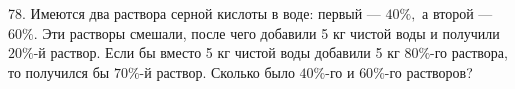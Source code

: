 78. Имеются два раствора серной кислоты в воде: первый --- $40\%,$ а второй --- $60\%.$ Эти растворы смешали, после чего добавили 5 кг чистой воды и получили $20\%$-й раствор. Если бы вместо 5 кг чистой воды добавили 5 кг $80\%$-го раствора, то получился бы $70\%$-й раствор. Сколько было $40\%$-го и $60\%$-го растворов?\\
